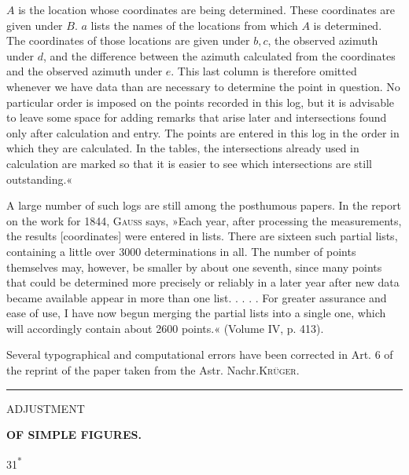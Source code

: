 {\(A\) is the location whose coordinates are being determined. These coordinates are given under \(B\). \(a\) lists the names of the locations from which \(A\) is determined. The coordinates of those locations are given under \(b,c\), the observed azimuth under \(d\), and the difference between the azimuth calculated from the coordinates and the observed azimuth under \(e\). This last column is therefore omitted whenever we have  data than are necessary to determine the point in question. No particular order is imposed on the points recorded in this log, but it is advisable to leave some space for adding remarks that arise later and intersections found only after calculation and entry. The points are entered in this log in the order in which they are calculated. In the tables, the intersections already used in calculation are marked so that it is easier to see which intersections are still outstanding.«

A large number of such logs are still among the posthumous papers. In the report on the work for 1844, \textsc{Gauss} says, »Each year, after processing the measurements, the results [coordinates] were entered in lists. There are sixteen such partial lists, containing a little over 3000 determinations in all. The number of points themselves may, however, be smaller by about one seventh, since many points that could be determined more precisely or reliably in a later year after new data became available appear in more than one list. . . . . For greater assurance and ease of use, I have now begun merging the partial lists into a single one, which will accordingly contain about 2600 points.« (Volume IV, p. 413).

Several typographical and computational errors have been corrected in Art. 6 of the reprint of the paper taken from the Astr. Nachr.\hfill\textsc{Krüger.}\par
\begin{center}\rule{4cm}{.4pt}\end{center}
}

\par\clearpage

\thispagestyle{empty}
\vspace*{.23\textheight}
{\centering
{\LARGE ADJUSTMENT\par}
\medskip
{\LARGE\bfseries OF SIMPLE FIGURES.\par}
}
\vfill
\noindent\hfill31\textsuperscript{*}\hspace*{.15\linewidth}\par
\vspace*{.14\textheight}

